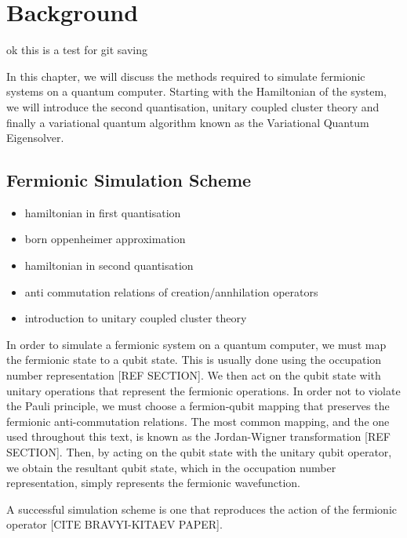 \chapter{\label{background}Background}
ok this is a test for git saving

In this chapter, we will discuss the methods required to simulate fermionic systems on a quantum computer. Starting with the Hamiltonian of the system, we will introduce the second quantisation, unitary coupled cluster theory and finally a variational quantum algorithm known as the Variational Quantum Eigensolver.

\section{Fermionic Simulation Scheme}

\begin{itemize}
    \item hamiltonian in first quantisation
    \item born oppenheimer approximation
    \item hamiltonian in second quantisation
    \item anti commutation relations of creation/annhilation operators
    \item introduction to unitary coupled cluster theory
\end{itemize}

In order to simulate a fermionic system on a quantum computer, we must map the fermionic state to a qubit state. This is usually done using the occupation number representation [REF SECTION]. We then act on the qubit state with unitary operations that represent the fermionic operations. In order not to violate the Pauli principle, we must choose a fermion-qubit mapping that preserves the fermionic anti-commutation relations. The most common mapping, and the one used throughout this text, is known as the Jordan-Wigner transformation [REF SECTION]. Then, by acting on the qubit state with the unitary qubit operator, we obtain the resultant qubit state, which in the occupation number representation, simply represents the fermionic wavefunction.

A successful simulation scheme is one that reproduces the action of the fermionic operator [CITE BRAVYI-KITAEV PAPER].
